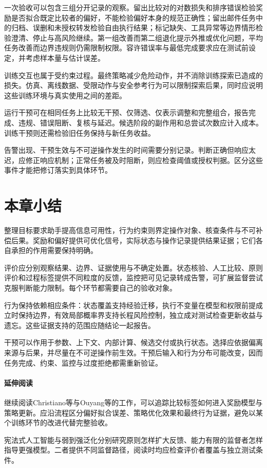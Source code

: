 一次验收可以包含三组分开记录的观察。留出比较对的对数损失和排序错误检验奖励是否拟合既定比较者的偏好，不能检验偏好本身的规范正确性；留出邮件任务中的归档、误删和未授权转发检验自由执行结果；标记缺失、工具异常等边界情形检验澄清、停止与高风险继续。第一组改善而第二组退化提示外推或优化问题，平均任务改善而边界违规则仍需限制权限。容许错误率与最低完成要求应在测试前设定，并考虑样本量与估计误差。

训练交互也属于受约束过程。最终策略减少危险动作，并不消除训练探索已造成的损失。仿真、离线数据、受限动作与安全参考行为可以限制探索后果，同时应说明这些训练环境与真实使用之间的差距。

运行干预可在相同任务上比较无干预、仅筛选、仅表示调整和完整组合，报告完成、违规、错误阻断、复核与延迟。候选阶段的副作用和总尝试次数应计入成本。训练干预则还需检验旧任务保持与新任务收益。

告警出现、干预生效与不可逆操作发生的时间需要分别记录。判断正确但响应太迟，应修正响应机制；正常任务被及时阻断，则应检查阈值或授权判据。区分这些事件才能把修订落实到具体环节。

\section{本章小结}
\label{sec:alignment-summary}

整理目标要求助手提高信息可用性，行为约束则界定操作对象、核查条件与不可补偿后果。奖励和偏好提供可优化信号，实际状态与操作记录提供结果证据；它们各自承担的作用需要保持明确。

评价应分别观察结果、边界、证据使用与不确定处置。状态核验、人工比较、原则评价和过程标签提供不同粒度的反馈，监控把可见记录转成告警，可扩展监督尝试克服判断能力限制。每个环节都需要自己的验收对象。

行为保持依赖相应条件：状态覆盖支持经验迁移，执行不变量在模型和权限前提成立时保持边界，有效局部概率界支持长程风险控制，独立成对测试检查更新收益与遗忘。这些证据支持的范围应随结论一起报告。

干预可以作用于参数、上下文、内部计算、候选交付或执行状态。选择应依据偏离来源与后果，并尽量在不可逆操作前生效。干预后输入和行为分布可能改变，因而任务完成、约束、监控与过度拒绝都需重新验证。

\paragraph{延伸阅读}

继续阅读Christiano等与Ouyang等的工作，可以追踪比较标签如何进入奖励模型与策略更新。应沿流程区分偏好拟合误差、策略优化效果和最终行为证据，避免以某个训练环节的改进代替完整验收。

宪法式人工智能与弱到强泛化分别研究原则怎样扩大反馈、能力有限的监督者怎样指导更强模型。二者提供不同监督路径，阅读时均应检查评价者覆盖与独立测试条件。